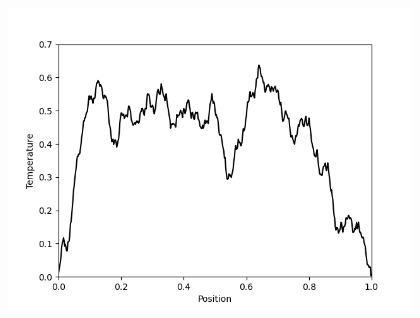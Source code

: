 \documentclass{beamer}
\begin{document}
\begin{frame}
  \begin{figure}
    \href{run:forward_heat_equation.mp4}{\includegraphics[width=12cm,height=8cm]{forward_heat_equation.png}}    
    
  \end{figure}
\end{frame}
\end{document}
